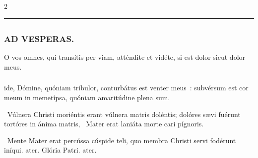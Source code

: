 \documentclass[9pt,twoside]{extarticle}
\begin{document}
\begin{multicols}{2}
\begin{center}\textcolor{red}{\rule{\linewidth}{0.5pt}} \end{center}

\subsection*{\center {}}
\begin{center}\end{center}

\subsubsection*{\center \textsc{AD VESPERAS.}}
\begin{center}\end{center}
\begin{tightlist}{}
\item {} O vos omnes, qui transítis per viam, atténdite et vidéte, si est dolor sicut dolor meus.
\item {}
\end{tightlist}
\subsubsection*{}
ide, Dómine, quóniam tríbulor, conturbátus est venter meus~: subvérsum est cor meum in memetípsa, quóniam amaritúdine plena sum.

\begin{tightlist}{}
\item {}
\item {}~Vúlnera Christi moriéntis erant vúlnera matris doléntis; dolóres sævi fuérunt tortóres in ánima matris, \textred{*}~Mater erat laniáta morte cari pígnoris.
\item {}~Mente Mater erat percússa cúspide teli, quo membra Christi servi fodérunt iníqui. ater. Glória Patri. ater.
\end{tightlist}


\end{multicols}
\end{document}
